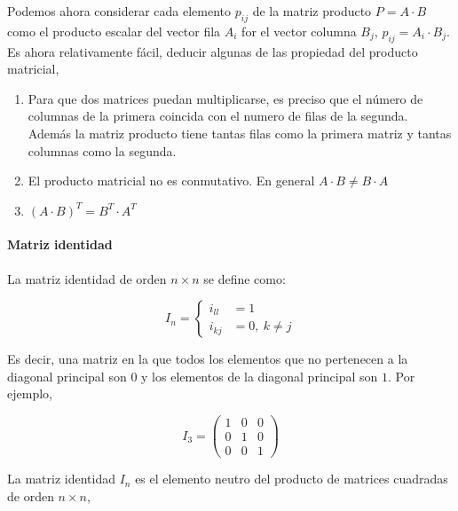 \begin{paracol}{2}
Podemos ahora considerar  cada elemento $p_{ij}$ de la matriz producto $P=A\cdot B$ como el producto escalar del vector fila $A_i$ for el vector columna $B_j$, $p_{ij}=A_i\cdot B_j$. 
Es ahora relativamente fácil, deducir algunas de las propiedad del producto matricial,

\begin{enumerate}
\item Para que dos matrices puedan multiplicarse, es preciso que el número de columnas de la primera coincida con el numero de filas de la segunda. Además la matriz producto tiene tantas filas como la primera matriz y tantas columnas como la segunda.

\item El producto matricial no es conmutativo. En general $A\cdot B \neq B \cdot A$

\item $(A\cdot B)^T=B^T\cdot A^T$
\end{enumerate}
\paragraph{Matriz identidad} La matriz identidad de orden $n\times n$ se 
define como:
\end{paracol}
\begin{equation*}
I_n= \left\{ 
\begin{aligned}
i_{ll}&=1\\
i_{kj}&=0, \ k\neq j
\end{aligned}
\right.
\end{equation*}

\begin{paracol}{2}
Es decir, una matriz en la que todos los elementos que no pertenecen a la diagonal principal son $0$ y los elementos de la diagonal principal son $1$. Por ejemplo,
    
\end{paracol}

\begin{equation*}
I_3=\begin{pmatrix}
1& 0& 0\\
0& 1& 0\\
0& 0& 1
\end{pmatrix}
\end{equation*}

\begin{paracol}{2}
La matriz identidad $I_n$ es el elemento neutro del producto de matrices cuadradas de orden $n\times n$,    
\end{paracol}

